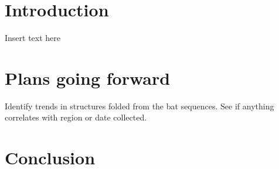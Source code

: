 

\maketitle

\section{Introduction}
Insert text here

\section{Plans going forward}
Identify trends in structures folded from the bat sequences. See if anything correlates with region or date collected.

\section{Conclusion}




